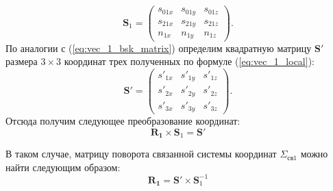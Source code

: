 \documentclass[../main.tex]{subfiles}
\begin{document}
\begin{equation}\label{eq:vec_1_bsk_matrix}
    \mathbf{S}_1 =
    \left(
        \begin{matrix}
            s_{01x} & s_{01y} & s_{01z} \\
            s_{21x} & s_{21y} & s_{21z} \\
            n_{1x} & n_{1y} & n_{1z}
        \end{matrix}
    \right).
\end{equation}
По аналогии с (\ref{eq:vec_1_bsk_matrix}) определим квадратную матрицу $\mathbf{S}'$ размера $3 \times 3$ координат трех полученных по формуле (\ref{eq:vec_1_local}):
\begin{equation}\label{eq:vec_1_local_matrix}
    \mathbf{S}' =
    \left(
        \begin{matrix}
            s'_{1x} & s'_{1y} & s'_{1z} \\
            s'_{2x} & s'_{2y} & s'_{2z} \\
            s'_{3x} & s'_{3y} & s'_{3z}
        \end{matrix}
    \right).
\end{equation}
Отсюда получим следующее преобразование координат:
\begin{equation*}
    \mathbf{R_1} \times \mathbf{S}_1 = \mathbf{S}'
\end{equation*}

В таком случае, матрицу поворота связанной системы координат $\Sigma_{\text{св}1}$ можно найти следующим образом:
\begin{equation}
    \mathbf{R_1} = \mathbf{S}' \times \mathbf{S}_1^{-1}
\end{equation}
\end{document}
